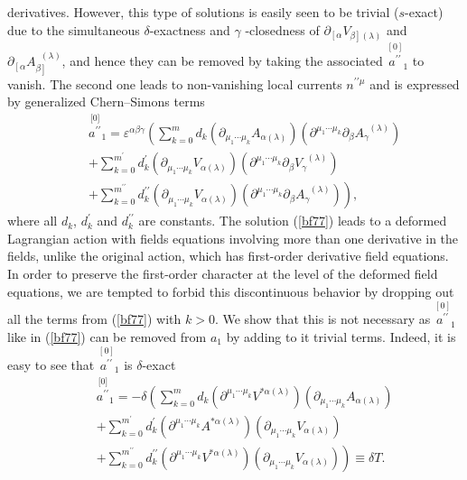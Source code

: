\documentclass[a4paper,11pt]{article}
\begin{document}
derivatives. However, this type of solutions is easily seen to be trivial ($%
s $-exact) due to the simultaneous $\delta $-exactness and $\gamma $%
-closedness of $\partial _{\left[ \alpha \right. }V_{\left. \beta \right]
(\lambda )}$ and $\partial _{\left[ \alpha \right. }A_{\left. \beta \right]
}^{\;\;(\lambda )}$, and hence they can be removed by taking the associated $%
\stackrel{[0]}{a^{\prime \prime }}_{1}$ to vanish. The second one leads to
non-vanishing local currents $n^{\prime \prime \mu }$ and is expressed by
generalized Chern--Simons terms
\begin{eqnarray}
&&\stackrel{\lbrack 0]}{a^{\prime \prime }}_{1}=\varepsilon ^{\alpha \beta
\gamma }\left( \sum_{k=0}^{m}d_{k}\left( \partial _{\mu _{1}\cdots \mu
_{k}}A_{\alpha (\lambda )}\right) \left( \partial ^{\mu _{1}\cdots \mu
_{k}}\partial _{\beta }A_{\gamma }^{\;\;(\lambda )}\right) \right.  \nonumber
\\
&&+\sum_{k=0}^{m^{\prime }}d_{k}^{\prime }\left( \partial _{\mu _{1}\cdots
\mu _{k}}V_{\alpha (\lambda )}\right) \left( \partial ^{\mu _{1}\cdots \mu
_{k}}\partial _{\beta }V_{\gamma }^{\;\;(\lambda )}\right)  \nonumber \\
&&\left. +\sum_{k=0}^{m^{\prime \prime }}d_{k}^{\prime \prime }\left(
\partial _{\mu _{1}\cdots \mu _{k}}V_{\alpha (\lambda )}\right) \left(
\partial ^{\mu _{1}\cdots \mu _{k}}\partial _{\beta }A_{\gamma
}^{\;\;(\lambda )}\right) \right) ,  \label{bf77}
\end{eqnarray}
where all $d_{k}$, $d_{k}^{\prime }$ and $d_{k}^{\prime \prime }$ are
constants. The solution (\ref{bf77}) leads to a deformed Lagrangian action
with fields equations involving more than one derivative in the fields,
unlike the original action, which has first-order derivative field
equations. In order to preserve the first-order character at the level of
the deformed field equations, we are tempted to forbid this discontinuous
behavior by dropping out all the terms from (\ref{bf77}) with $k>0$. We show
that this is not necessary as $\stackrel{[0]}{a^{\prime \prime }}_{1}$ like
in (\ref{bf77}) can be removed from $a_{1}$ by adding to it trivial terms.
Indeed, it is easy to see that $\stackrel{[0]}{a^{\prime \prime }}_{1} $ is $%
\delta $-exact
\begin{eqnarray}
&&\stackrel{\lbrack 0]}{a^{\prime \prime }}_{1}=-\delta \left(
\sum_{k=0}^{m}d_{k}\left( \partial ^{\mu _{1}\cdots \mu _{k}}V^{*\alpha
(\lambda )}\right) \left( \partial _{\mu _{1}\cdots \mu _{k}}A_{\alpha
(\lambda )}\right) \right.  \nonumber \\
&&+\sum_{k=0}^{m^{\prime }}d_{k}^{\prime }\left( \partial ^{\mu _{1}\cdots
\mu _{k}}A^{*\alpha (\lambda )}\right) \left( \partial _{\mu _{1}\cdots \mu
_{k}}V_{\alpha (\lambda )}\right)  \nonumber \\
&&\left. +\sum_{k=0}^{m^{\prime \prime }}d_{k}^{\prime \prime }\left(
\partial ^{\mu _{1}\cdots \mu _{k}}V^{*\alpha (\lambda )}\right) \left(
\partial _{\mu _{1}\cdots \mu _{k}}V_{\alpha (\lambda )}\right) \right)
\equiv \delta T.  \label{bf78a}
\end{eqnarray}
\end{document}
